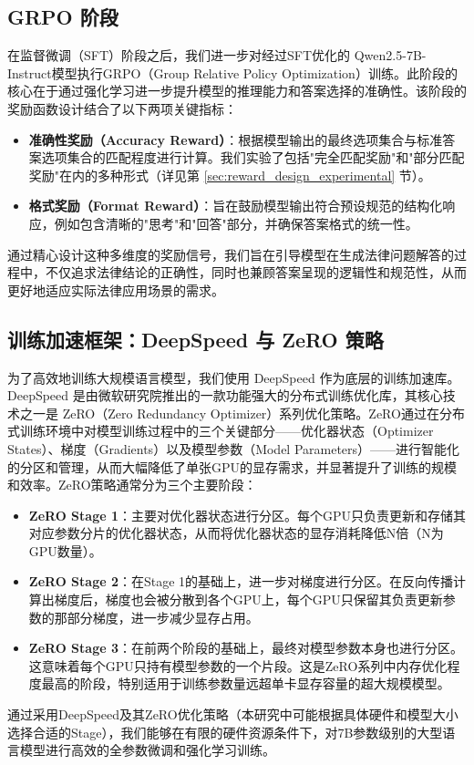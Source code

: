 \documentclass{article}
\newcommand{\qwen}{Qwen2.5-7B-Instruct}
\newcommand{\qwen}{Qwen2.5-7B-Instruct}
\begin{document}
\subsection{GRPO 阶段}

在监督微调（SFT）阶段之后，我们进一步对经过SFT优化的 \qwen 模型执行GRPO（Group Relative Policy Optimization）训练。此阶段的核心在于通过强化学习进一步提升模型的推理能力和答案选择的准确性。该阶段的奖励函数设计结合了以下两项关键指标：
\begin{itemize}
\item \textbf{准确性奖励（Accuracy Reward）}：根据模型输出的最终选项集合与标准答案选项集合的匹配程度进行计算。我们实验了包括"完全匹配奖励"和"部分匹配奖励"在内的多种形式（详见第 \ref{sec:reward_design_experimental} 节）。
\item \textbf{格式奖励（Format Reward）}：旨在鼓励模型输出符合预设规范的结构化响应，例如包含清晰的"思考"和"回答"部分，并确保答案格式的统一性。
\end{itemize}
通过精心设计这种多维度的奖励信号，我们旨在引导模型在生成法律问题解答的过程中，不仅追求法律结论的正确性，同时也兼顾答案呈现的逻辑性和规范性，从而更好地适应实际法律应用场景的需求。

\subsection{训练加速框架：DeepSpeed 与 ZeRO 策略}

为了高效地训练大规模语言模型，我们使用 DeepSpeed 作为底层的训练加速库。DeepSpeed 是由微软研究院推出的一款功能强大的分布式训练优化库，其核心技术之一是 ZeRO（Zero Redundancy Optimizer）系列优化策略。ZeRO通过在分布式训练环境中对模型训练过程中的三个关键部分——优化器状态（Optimizer States）、梯度（Gradients）以及模型参数（Model Parameters）——进行智能化的分区和管理，从而大幅降低了单张GPU的显存需求，并显著提升了训练的规模和效率。ZeRO策略通常分为三个主要阶段：
\begin{itemize}
\item \textbf{ZeRO Stage 1}：主要对优化器状态进行分区。每个GPU只负责更新和存储其对应参数分片的优化器状态，从而将优化器状态的显存消耗降低N倍（N为GPU数量）。
\item \textbf{ZeRO Stage 2}：在Stage 1的基础上，进一步对梯度进行分区。在反向传播计算出梯度后，梯度也会被分散到各个GPU上，每个GPU只保留其负责更新参数的那部分梯度，进一步减少显存占用。
\item \textbf{ZeRO Stage 3}：在前两个阶段的基础上，最终对模型参数本身也进行分区。这意味着每个GPU只持有模型参数的一个片段。这是ZeRO系列中内存优化程度最高的阶段，特别适用于训练参数量远超单卡显存容量的超大规模模型。
\end{itemize}
通过采用DeepSpeed及其ZeRO优化策略（本研究中可能根据具体硬件和模型大小选择合适的Stage），我们能够在有限的硬件资源条件下，对7B参数级别的大型语言模型进行高效的全参数微调和强化学习训练。
\end{document}
